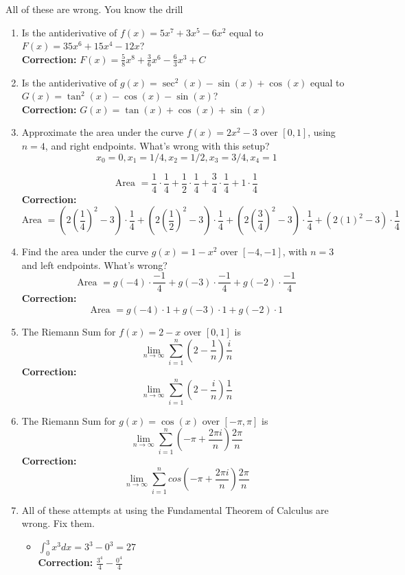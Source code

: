 \documentclass{article}
\begin{document}
All of these are wrong. You know the drill
\begin{enumerate}
\item Is the antiderivative of $f(x) = 5x^7 + 3x^5 - 6x^2$ equal to $F(x) = 35x^6 + 15x^4 - 12x$?\\
\textbf{Correction:} $F(x) = \frac{5}{8}x^8 + \frac{3}{6}x^6 - \frac{6}{3}x^3 + C$
\item Is the antiderivative of $g(x) = \sec^2(x) - \sin(x) + \cos(x)$ equal to $G(x) = \tan^2(x) - \cos(x) - \sin(x)$?\\
\textbf{Correction:} $G(x) = \tan(x) + \cos(x) + \sin(x)$

\item Approximate the area under the curve $f(x) = 2x^2 - 3$ over $[0,1]$, using $n=4$, and right endpoints. What's wrong with this setup?
$$x_0 = 0, x_1 = 1/4, x_2 = 1/2, x_3 = 3/4, x_4 =1$$

$$\mbox{Area } =  \frac{1}{4} \cdot \frac{1}{4} + \frac{1}{2} \cdot \frac{1}{4} + \frac{3}{4} \cdot \frac{1}{4} + 1 \cdot \frac{1}{4}$$
\textbf{Correction:}$$\mbox{Area } =  (2(\frac{1}{4})^2 -3) \cdot \frac{1}{4} + (2(\frac{1}{2})^2 -3) \cdot \frac{1}{4} + (2(\frac{3}{4})^2 -3) \cdot \frac{1}{4} + (2(1)^2 -3)\cdot \frac{1}{4}$$

\item Find the area under the curve $g(x) = 1-x^2$ over $[-4,-1]$, with $n=3$ and left endpoints. What's wrong?
$$\mbox{Area } =  g(-4) \cdot \frac{-1}{4} + g(-3) \cdot \frac{-1}{4} + g(-2) \cdot \frac{-1}{4}$$
\textbf{Correction:} $$\mbox{Area } =  g(-4) \cdot 1 + g(-3) \cdot 1 + g(-2) \cdot 1$$

\item The Riemann Sum for $f(x) = 2-x$ over $[0,1]$ is 
$$\lim_{n \rightarrow \infty} \sum_{i=1}^n (2 - \frac{1}{n}) \frac{i}{n}$$
\textbf{Correction:}
$$\lim_{n \rightarrow \infty} \sum_{i=1}^n (2 - \frac{i}{n}) \frac{1}{n}$$
\item The Riemann Sum for $g(x) = \cos(x)$ over $[-\pi, \pi]$ is
$$\lim_{n \rightarrow \infty} \sum_{i=1}^n (-\pi + \frac{2\pi i}{n}) \frac{2\pi}{n}$$
\textbf{Correction:}
$$\lim_{n \rightarrow \infty} \sum_{i=1}^n cos(-\pi + \frac{2\pi i}{n}) \frac{2\pi}{n}$$

\item All of these attempts at using the Fundamental Theorem of Calculus are wrong. Fix them.
\begin{itemize}
    \item $\int_0^3 x^3 dx = 3^3 - 0^3 = 27$\\
    \textbf{Correction:} $\frac{3^4}{4} - \frac{0^4}{4}$


\end{itemize}
\end{enumerate}
\end{document}
